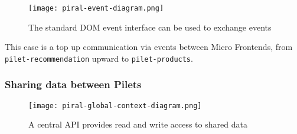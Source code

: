 \documentclass[a4paper]{book}
\begin{document}
\begin{figure}[h!]
  \centering
  \captionsetup{justification=centering}
  \texttt{[image: piral-event-diagram.png]}
  \caption{The standard DOM event interface can be used to exchange events \cite{Rap20}}
  \label{fig:piral-event-diagram}
\end{figure}

This case is a top up communication via events between Micro Frontends, from \verb|pilet-recommendation| upward to \verb|pilet-products|.  

\subsubsection{Sharing data between Pilets}

\begin{figure}[h!]
  \centering
  \captionsetup{justification=centering}
  \texttt{[image: piral-global-context-diagram.png]}
  \caption{A central API provides read and write access to shared data \cite{Rap20}}
  \label{fig:piral-global-context-diagram}
\end{figure}
\end{document}
